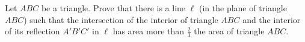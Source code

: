 Let $ABC$ be a triangle.  Prove that there is a line $\ell$ (in the plane of triangle $ABC$) such that the intersection of the interior of triangle $ABC$ and the interior of its reflection $A'B'C'$ in $\ell$ has area more than $\frac23$ the area of triangle $ABC$.